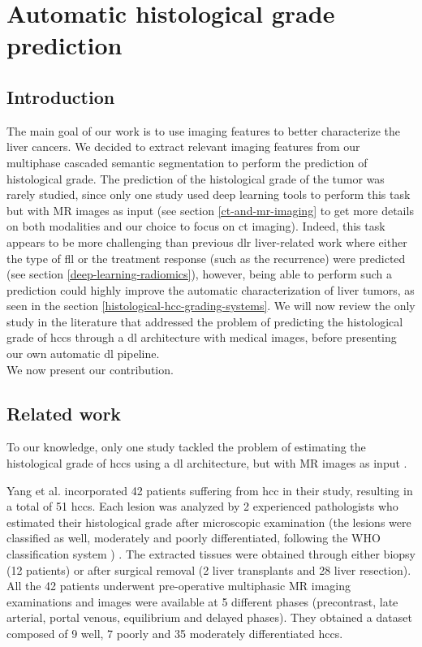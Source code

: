 \section{Automatic histological grade prediction}

\subsection{Introduction}\label{introduction}

The main goal of our work is to use imaging features to better characterize the liver cancers.
We decided to extract relevant imaging features from our multiphase cascaded semantic segmentation
to perform the prediction of histological grade.
The prediction of the histological grade of the tumor was rarely studied, since only one study
used deep learning tools to perform this task but with MR images as
input \cite{Yang2019} (see section \ref{ct-and-mr-imaging} to get more details on both modalities and our choice to focus on \ac{ct} imaging).
Indeed, this task appears to be more challenging than previous \ac{dlr}
liver-related work where either the type of \ac{fll} or the treatment
response (such as the recurrence) were predicted (see section \ref{deep-learning-radiomics}), however, being able to perform such a prediction could highly improve the automatic characterization of liver tumors, as seen in the section \ref{histological-hcc-grading-systems}.
We will now review the only study in the literature that addressed the
problem of predicting the histological grade of \ac{hcc}s through a \ac{dl}
architecture with medical images, before presenting our own automatic \ac{dl}
pipeline.\\
We now present our contribution.

\subsection{Related work}\label{dlr-based-study-to-predict-the-histological-hcc-grade}

To our knowledge, only one study tackled the problem of estimating the
histological grade of \ac{hcc}s using a \ac{dl} architecture, but with MR images
as input \cite{Yang2019}.

Yang et al. incorporated 42 patients suffering from \ac{hcc} in their study,
resulting in a total of 51 \ac{hcc}s. Each lesion was analyzed by 2
experienced pathologists who estimated their histological grade after
microscopic examination (the lesions were classified as well, moderately
and poorly differentiated, following the WHO classification system \cite{20113051318}) .
The extracted tissues were obtained through either biopsy (12 patients)
or after surgical removal (2 liver transplants and 28 liver resection).
All the 42 patients underwent pre-operative multiphasic MR imaging
examinations and images were available at 5 different phases
(precontrast, late arterial, portal venous, equilibrium and delayed
phases). They obtained a dataset composed of 9 well, 7 poorly and 35 moderately
differentiated \ac{hcc}s.

